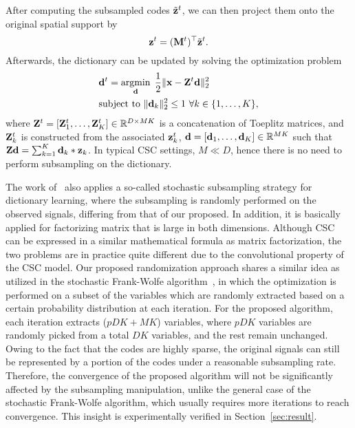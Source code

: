 After computing the subsampled codes $\subcode^\ite$, we can then project them
onto the original spatial support by
\begin{equation} \label{eq:upsampleCode}
    \code^\ite = (\mask^{\ite})^\top \subcode^\ite.
\end{equation}
Afterwards, the dictionary can be updated by solving the optimization problem
\begin{equation} \label{eq:updatingFilter}
\begin{split}
   & \filter^{\ite} = \minimize{\filter} \frac{1}{2}\|\signal - \Code^{\ite} \filter \|_2^2 \\
   & \text{subject to}  ~ \|\filter_k\|^2_2 \leq 1 ~ \forall k \in \{1,\dots,K\},
\end{split}
\end{equation}
where $\Code^{\ite}= [\Code_1^{\ite}, \dots, \Code_K^{\ite}]
\in \mathbb{R}^{D \times MK}$ is a concatenation of Toeplitz matrices,
and $\Code_k^{\ite}$ is constructed from the associated $\code_k^{\ite}$, $\filter=
[\filter_1,\dots,\filter_K] \in \mathbb{R}^{MK}$ such that $ \Code
\filter = \sum_{k=1}^{K} \filter_k * \code_k$. In typical CSC
settings, $M \ll D$, hence there is no need to perform subsampling on
the dictionary.

The work of~\cite{mensch2016dictionary} also applies a so-called
stochastic subsampling strategy for dictionary learning, where the
subsampling is randomly performed on the observed signals, differing
from that of our proposed. In addition, it is basically applied for
factorizing matrix that is large in both dimensions. Although CSC can
be expressed in a similar mathematical formula as matrix factorization, the two
problems are in practice quite different due to the convolutional
property of the CSC model. Our proposed randomization
approach shares a similar idea as utilized in the stochastic Frank-Wolfe
algorithm~\cite{reddi2016stochastic,pmlr-v80-kerdreux18a}, in which
the optimization is performed on a subset of the variables which are
randomly extracted based on a certain probability distribution at each
iteration. For the proposed algorithm, each iteration extracts
($pDK+MK$) variables, where $pDK$ variables are randomly picked from a
total $DK$ variables, and the rest remain unchanged. Owing to the fact
that the codes are highly sparse, the original signals can still be
represented by a portion of the codes under a reasonable subsampling
rate. Therefore, the convergence of the proposed algorithm will not be
significantly affected by the subsampling manipulation, unlike the
general case of the stochastic Frank-Wolfe algorithm, which usually
requires more iterations to reach convergence. This insight is
experimentally verified in Section~\ref{sec:result}.


